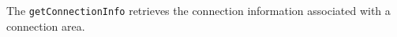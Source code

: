 The \verb+getConnectionInfo+ retrieves the connection information associated with a connection area.
